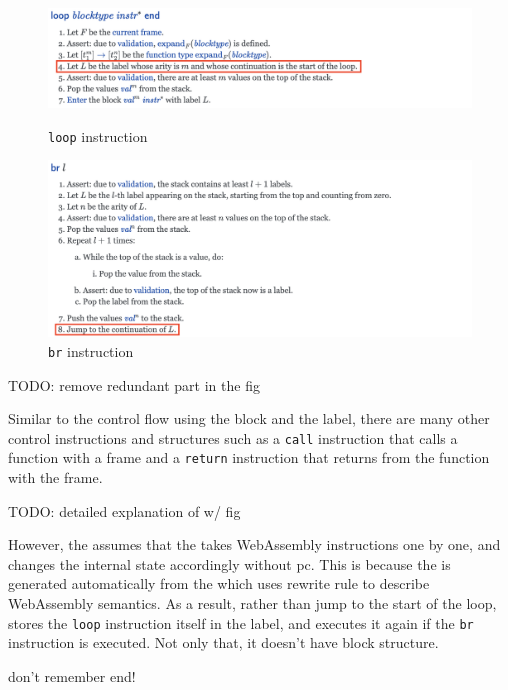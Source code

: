 \begin{figure}[h!]
    \centerline{\includegraphics[width=15cm]{fig/loop}}
    \caption[Enter the caption title here]{\texttt{loop} instruction} \label{loop-fig}
    \centerline{\includegraphics[width=15cm]{fig/br}}
    \caption[Enter the caption title here]{\texttt{br} instruction} \label{br-fig}
\end{figure}
TODO: remove redundant part in the fig

Similar to the control flow using the block and the label, there are many other
control instructions and structures such as a \texttt{call} instruction that
calls a function with a frame and a \texttt{return} instruction that returns from
the function with the frame.


TODO: detailed explanation of \spectecp{} w/ fig

However, the \spectecp{} assumes that the  takes WebAssembly
instructions one by one, and changes the internal state accordingly without pc.
This is because the \spectecp{} is generated automatically from the 
which uses rewrite rule to describe WebAssembly semantics.
As a result, rather than jump to the start of the loop, \spectecp{} stores the
\texttt{loop} instruction itself in the label, and executes it again if the
\texttt{br} instruction is executed.
Not only that, it doesn't have block structure.

don't remember end!





